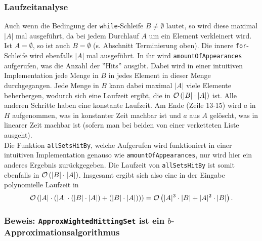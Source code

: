\documentclass[a4paper]{article}
\begin{document}
		\subsubsection*{Laufzeitanalyse}
		Auch wenn die Bedingung der \texttt{while}-Schleife $B\neq\emptyset$ lautet, so wird diese maximal $|A|$ mal ausgeführt, da bei jedem Durchlauf $A$ um ein Element verkleinert wird.
		Ist $A=\emptyset$, so ist auch $B=\emptyset$ (s. Abschnitt Terminierung oben).\n
		Die innere \texttt{for}-Schleife wird ebenfalls $|A|$ mal ausgeführt.
		In ihr wird \texttt{amountOfAppearances} aufgerufen, was die Anzahl der ''Hits'' ausgibt.
		Dabei wird in einer intuitiven Implementation jede Menge in $B$ in jedes Element in dieser Menge durchgegangen.
		Jede Menge in $B$ kann dabei maximal $|A|$ viele Elemente beherbergen, wodurch sich eine Laufzeit ergibt, die in $\mathcal{O}\left(|B|\cdot |A|\right)$ ist.
		Alle anderen Schritte haben eine konstante Laufzeit.\n
		Am Ende (Zeile 13-15) wird $a$ in $H$ aufgenommen, was in konstanter Zeit machbar ist und $a$ aus $A$ gelöscht, was in linearer Zeit machbar ist (sofern man bei beiden von einer verketteten Liste ausgeht).\\
		Die Funktion \texttt{allSetsHitBy}, welche Aufgerufen wird funktioniert in einer intuitiven Implementation genauso wie \texttt{amountOfAppearances}, nur wird hier ein anderes Ergebnis zurückgegeben. 
		Die Laufzeit von \texttt{allSetsHitBy} ist somit ebenfalls in $\mathcal{O}\left(|B|\cdot |A|\right)$.\n
		Insgesamt ergibt sich also eine in der Eingabe polynomielle Laufzeit in \[\mathcal{O}\left(|A|\cdot (|A|\cdot (|B|\cdot |A|) + (|B|\cdot |A|))\right)=\mathcal{O}\left(|A|^3\cdot |B|+|A|^2\cdot |B|\right).\]
		
		\subsubsection*{Beweis: \texttt{ApproxWightedHittingSet} ist ein $b$-Approximationsalgorithmus}
		
	\section{}
\end{document}
